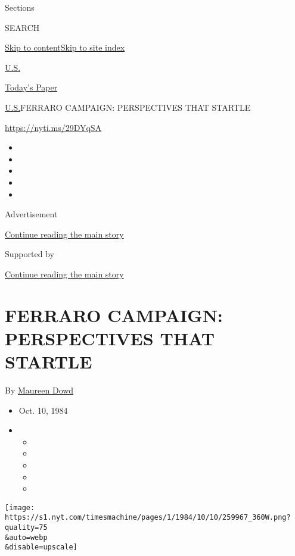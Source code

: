 Sections

SEARCH

\protect\hyperlink{site-content}{Skip to
content}\protect\hyperlink{site-index}{Skip to site index}

\href{https://www.nytimes.com/section/us}{U.S.}

\href{https://myaccount.nytimes.com/auth/login?response_type=cookie\&client_id=vi}{}

\href{https://www.nytimes.com/section/todayspaper}{Today's Paper}

\href{/section/us}{U.S.}\textbar{}FERRARO CAMPAIGN: PERSPECTIVES THAT
STARTLE

\href{https://nyti.ms/29DYqSA}{https://nyti.ms/29DYqSA}

\begin{itemize}
\item
\item
\item
\item
\item
\end{itemize}

Advertisement

\protect\hyperlink{after-top}{Continue reading the main story}

Supported by

\protect\hyperlink{after-sponsor}{Continue reading the main story}

\hypertarget{ferraro-campaign-perspectives-that-startle}{%
\section{FERRARO CAMPAIGN: PERSPECTIVES THAT
STARTLE}\label{ferraro-campaign-perspectives-that-startle}}

By \href{https://www.nytimes.com/by/maureen-dowd}{Maureen Dowd}

\begin{itemize}
\item
  Oct. 10, 1984
\item
  \begin{itemize}
  \item
  \item
  \item
  \item
  \item
  \end{itemize}
\end{itemize}

\texttt{[image: https://s1.nyt.com/timesmachine/pages/1/1984/10/10/259967\_360W.png?quality=75\\\&auto=webp\\\&disable=upscale]}

